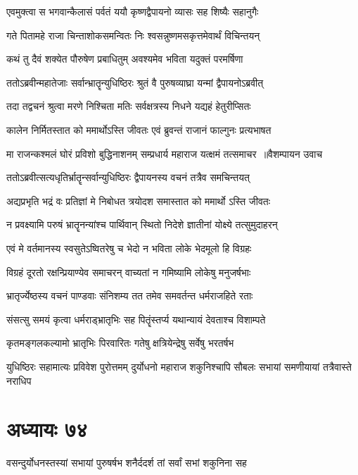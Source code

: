 \twolineshloka
{एवमुक्त्वा स भगवान्कैलासं पर्वतं ययौ}
{कृष्णद्वैपायनो व्यासः सह शिष्यैः सहानुगैः}


\twolineshloka
{गते पितामहे राजा चिन्ताशोकसमन्वितः}
{निः श्वसन्नुष्णमसकृत्तमेवार्थं विचिन्तयन्}


\twolineshloka
{कथं तु दैवं शक्येत पौरुषेण प्रबाधितुम्}
{अवश्यमेव भविता यदुक्तं परमर्षिणा}


\twolineshloka
{ततोऽब्रवीन्महातेजाः सर्वान्भ्रातॄन्युधिष्ठिरः}
{श्रुतं वै पुरुषव्याघ्रा यन्मां द्वैपायनोऽब्रवीत्}


\twolineshloka
{तदा तद्वचनं श्रुत्वा मरणे निश्चिता मतिः}
{सर्वक्षत्रस्य निधने यद्यहं हेतुरीप्सितः}


\twolineshloka
{कालेन निर्मितस्तात को ममार्थोऽस्ति जीवतः}
{एवं ब्रुवन्तं राजानं फाल्गुनः प्रत्यभाषत}


\twolineshloka
{मा राजन्कश्मलं घोरं प्रविशो बुद्धिनाशनम्}
{सम्प्रधार्य महाराज यत्क्षमं तत्समाचर ॥वैशम्पायन उवाच}


\twolineshloka
{ततोऽब्रवीत्सत्यधृतिर्भ्रातॄन्सर्वान्युधिष्ठिरः}
{द्वैपायनस्य वचनं तत्रैव समचिन्तयत्}


\twolineshloka
{अद्यप्रभृति भद्रं वः प्रतिज्ञां मे निबोधत}
{त्रयोदश समास्तात को ममार्थो ऽस्ति जीवतः}


\twolineshloka
{न प्रवक्ष्यामि परुषं भ्रातॄनन्यांश्च पार्थिवान्}
{स्थितो निदेशे ज्ञातीनां योक्ष्ये तत्सुमुदाहरन्}


\twolineshloka
{एवं मे वर्तमानस्य स्वसुतेऽष्वितरेषु च}
{भेदो न भविता लोके भेदमूलो हि विग्रहः}


\twolineshloka
{विग्रहं दूरतो रक्षन्प्रियाण्येव समाचरन्}
{वाच्यतां न गमिष्यामि लोकेषु मनुजर्षभाः}


\twolineshloka
{भ्रातृर्ज्येष्ठस्य वचनं पाण्डवाः संनिशम्य तत}
{तमेव समवर्तन्त धर्मराजहिते रताः}


\twolineshloka
{संसत्सु समयं कृत्वा धर्मराड्भ्रातृभिः सह}
{पितॄंस्तर्प्य यथान्यायं देवताश्च विशाम्पते}


\twolineshloka
{कृतमङ्गलकल्यामो भ्रातृभिः पिरवारितः}
{गतेषु क्षत्रियेन्द्रेषु सर्वेषु भरतर्षभ}


\threelineshloka
{युधिष्ठिरः सहामात्यः प्रविवेश पुरोत्तमम्}
{दुर्योधनो महाराज शकुनिश्चापि सौबलः}
{सभायां समणीयायां तत्रैवास्ते नराधिप}


\chapter{अध्यायः ७४}
\twolineshloka
{वसन्दुर्योधनस्तस्यां सभायां पुरुषर्षभ}
{शनैर्ददर्श तां सर्वां सभां शकुनिना सह}


